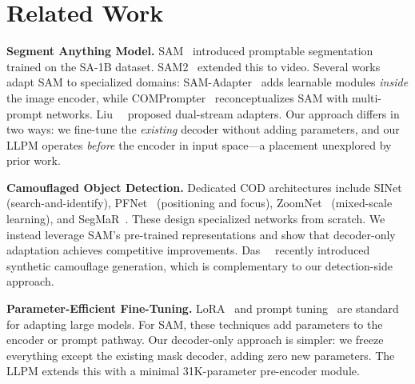 \section{Related Work}

\noindent\textbf{Segment Anything Model.}
SAM~\cite{kirillov2023sam} introduced promptable segmentation trained on the SA-1B dataset. SAM2~\cite{ravi2024sam2} extended this to video. Several works adapt SAM to specialized domains: SAM-Adapter~\cite{chen2023samadapter} adds learnable modules \emph{inside} the image encoder, while COMPrompter~\cite{hao2024comprompter} reconceptualizes SAM with multi-prompt networks. Liu~\etal~\cite{liu2025dualstream} proposed dual-stream adapters. Our approach differs in two ways: we fine-tune the \emph{existing} decoder without adding parameters, and our LLPM operates \emph{before} the encoder in input space---a placement unexplored by prior work.

\noindent\textbf{Camouflaged Object Detection.}
Dedicated COD architectures include SINet~\cite{fan2020cod10k} (search-and-identify), PFNet~\cite{mei2021pfnet} (positioning and focus), ZoomNet~\cite{pang2022zoomnet} (mixed-scale learning), and SegMaR~\cite{jia2022segmar}. These design specialized networks from scratch. We instead leverage SAM's pre-trained representations and show that decoder-only adaptation achieves competitive improvements. Das~\etal~\cite{das2025camouflage} recently introduced synthetic camouflage generation, which is complementary to our detection-side approach.

\noindent\textbf{Parameter-Efficient Fine-Tuning.}
LoRA~\cite{hu2022lora} and prompt tuning~\cite{lester2021prompt} are standard for adapting large models. For SAM, these techniques add parameters to the encoder or prompt pathway. Our decoder-only approach is simpler: we freeze everything except the existing mask decoder, adding zero new parameters. The LLPM extends this with a minimal 31K-parameter pre-encoder module.
